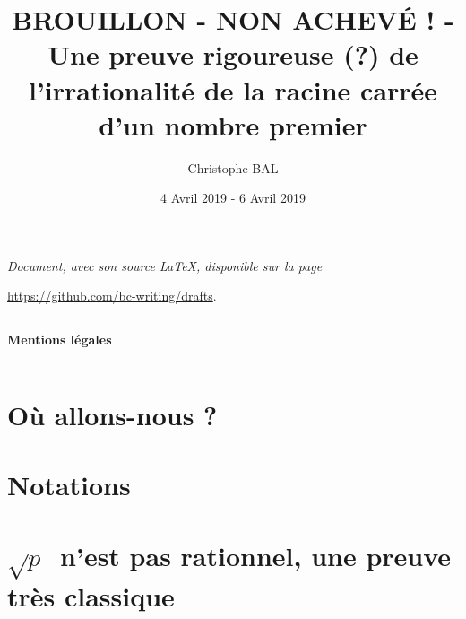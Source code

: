 \documentclass[12pt]{amsart}
\begin{document}
\title{BROUILLON - NON ACHEVÉ ! - Une preuve rigoureuse (\!?) de l'irrationalité de la racine carrée d'un nombre premier}
\author{Christophe BAL}
\date{4 Avril 2019 - 6 Avril 2019}

\maketitle

\begin{center}
	\itshape
	Document, avec son source \LaTeX, disponible sur la page
	
	\url{https://github.com/bc-writing/drafts}.
\end{center}


\bigskip


\begin{center}
	\hrule\vspace{.3em}
	{
		\fontsize{1.35em}{1em}\selectfont
		\textbf{Mentions \og légales \fg}
	}
			
	\vspace{0.45em}
	\doclicenseThis
	\hrule
\end{center}


\setcounter{tocdepth}{2}
\tableofcontents



\section{Où allons-nous ?}





\section{Notations}





\section{\texorpdfstring{$\sqrt{p\,}$ n'est pas rationnel, une preuve très classique}%
		                {Racine carrée de p n'est pas rationnel, une preuve très classique}}


\end{document}
